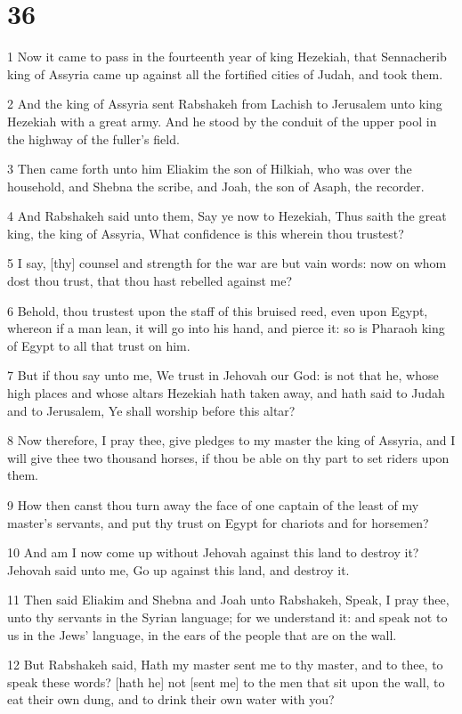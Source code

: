 \chapter{36}

\par 1 Now it came to pass in the fourteenth year of king Hezekiah, that Sennacherib king of Assyria came up against all the fortified cities of Judah, and took them.
\par 2 And the king of Assyria sent Rabshakeh from Lachish to Jerusalem unto king Hezekiah with a great army. And he stood by the conduit of the upper pool in the highway of the fuller's field.
\par 3 Then came forth unto him Eliakim the son of Hilkiah, who was over the household, and Shebna the scribe, and Joah, the son of Asaph, the recorder.
\par 4 And Rabshakeh said unto them, Say ye now to Hezekiah, Thus saith the great king, the king of Assyria, What confidence is this wherein thou trustest?
\par 5 I say, [thy] counsel and strength for the war are but vain words: now on whom dost thou trust, that thou hast rebelled against me?
\par 6 Behold, thou trustest upon the staff of this bruised reed, even upon Egypt, whereon if a man lean, it will go into his hand, and pierce it: so is Pharaoh king of Egypt to all that trust on him.
\par 7 But if thou say unto me, We trust in Jehovah our God: is not that he, whose high places and whose altars Hezekiah hath taken away, and hath said to Judah and to Jerusalem, Ye shall worship before this altar?
\par 8 Now therefore, I pray thee, give pledges to my master the king of Assyria, and I will give thee two thousand horses, if thou be able on thy part to set riders upon them.
\par 9 How then canst thou turn away the face of one captain of the least of my master's servants, and put thy trust on Egypt for chariots and for horsemen?
\par 10 And am I now come up without Jehovah against this land to destroy it? Jehovah said unto me, Go up against this land, and destroy it.
\par 11 Then said Eliakim and Shebna and Joah unto Rabshakeh, Speak, I pray thee, unto thy servants in the Syrian language; for we understand it: and speak not to us in the Jews' language, in the ears of the people that are on the wall.
\par 12 But Rabshakeh said, Hath my master sent me to thy master, and to thee, to speak these words? [hath he] not [sent me] to the men that sit upon the wall, to eat their own dung, and to drink their own water with you?
